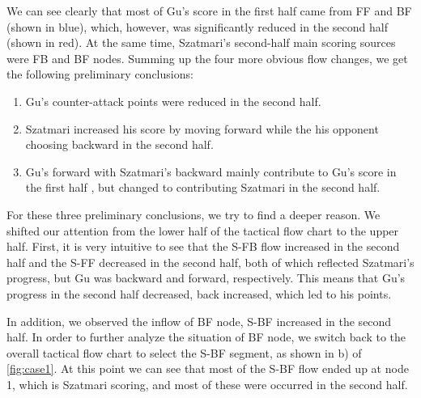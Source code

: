 \documentclass[journal]{vgtc}                %
\begin{document}
We can see clearly that most of Gu's score in the first half came from FF and BF (shown in blue), which, however, was significantly reduced in the second half (shown in red).
At the same time, Szatmari's second-half main scoring sources were FB and BF nodes.
Summing up the four more obvious flow changes, we get the following preliminary conclusions:
\begin{enumerate}
	\item Gu's counter-attack points were reduced in the second half.
	\item Szatmari increased his score by moving forward while the his opponent choosing backward in the second half.
	\item Gu's forward with Szatmari's backward mainly contribute to Gu's score in the first half , but changed to contributing Szatmari in the second half.
\end{enumerate}
For these three preliminary conclusions, we try to find a deeper reason.
We shifted our attention from the lower half of the tactical flow chart to the upper half.
First, it is very intuitive to see that the S-FB flow increased in the second half and the S-FF decreased in the second half, both of which reflected Szatmari's progress, but Gu was backward and forward, respectively.
This means that Gu's progress in the second half decreased, back increased, which led to his points.

In addition, we observed the inflow of BF node, S-BF increased in the second half.
In order to further analyze the situation of BF node, we switch back to the overall tactical flow chart to select the S-BF segment, as shown in b) of \autoref{fig:case1}.
At this point we can see that most of the S-BF flow ended up at node 1, which is Szatmari scoring, and most of these were occurred in the second half.
\end{document}
